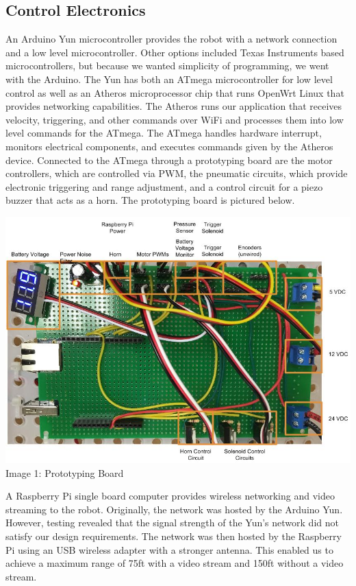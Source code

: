 \documentclass[letterpaper,12pt]{article}
\begin{document}
\subsection{Control Electronics}
An Arduino Yun microcontroller provides the robot with a network connection and
a low level microcontroller. Other options included Texas Instruments based
microcontrollers, but because we wanted simplicity of programming, we went with
the Arduino. The Yun has both an ATmega microcontroller for low level control
as well as an Atheros microprocessor chip that runs OpenWrt Linux that provides
networking capabilities. The Atheros runs our application that receives
velocity, triggering, and other commands over WiFi and processes them into low
level commands for the ATmega. The ATmega handles hardware interrupt, monitors
electrical components, and executes commands given by the Atheros device.
Connected to the ATmega through a prototyping board are the motor controllers,
which are controlled via PWM, the pneumatic circuits, which provide electronic
triggering and range adjustment, and a control circuit for a piezo buzzer that
acts as a horn. The prototyping board is pictured below.\\
\begin{center}
    \includegraphics[width=15cm]{./pics/electronics/AnnotatedProtoboard.jpg}\\
     Image 1: Prototyping Board
\end{center}

A Raspberry Pi single board computer provides wireless networking and video
streaming to the robot. Originally, the network was hosted by the Arduino Yun.
However, testing revealed that the signal strength of the Yun's network did not
satisfy our design requirements.  The network was then hosted by the Raspberry
Pi using an USB wireless adapter with a stronger antenna. This enabled us to
achieve a maximum range of 75ft with a video stream and 150ft without a video
stream.\\
\end{document}
